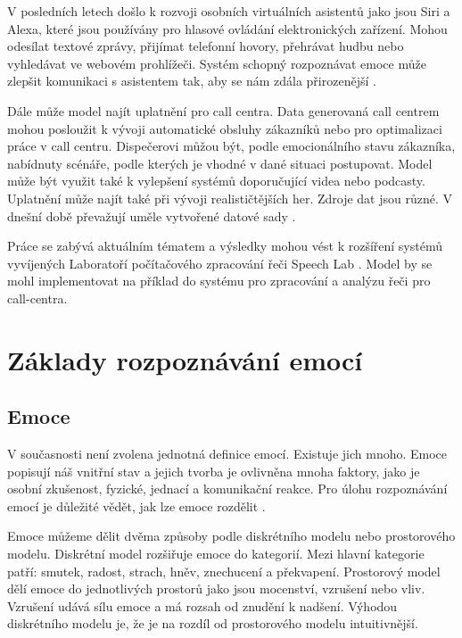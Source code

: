 \documentclass[FM,BP]{tulthesis}
\begin{document}
V posledních letech došlo k rozvoji osobních virtuálních asistentů jako jsou Siri a Alexa, které jsou používány pro hlasové ovládání elektronických zařízení. Mohou odesílat textové zprávy, přijímat telefonní hovory, přehrávat hudbu nebo vyhledávat ve webovém prohlížeči. Systém schopný rozpoznávat emoce může zlepšit komunikaci s asistentem tak, aby se nám zdála přirozenější \cite{DBLP:journals/corr/abs-1912-10458}.

Dále může model najít uplatnění pro call centra. Data generovaná call centrem mohou posloužit k vývoji automatické obsluhy zákazníků nebo pro optimalizaci práce v call centru. Dispečerovi můžou být, podle emocionálního stavu zákazníka, nabídnuty scénáře, podle kterých je vhodné v dané situaci postupovat. Model může být využit také k vylepšení systémů doporučující videa nebo podcasty. Uplatnění může najít také při vývoji realističtějších her. Zdroje dat jsou různé. V dnešní době převažují uměle vytvořené datové sady \cite{konar_chakraborty_2015}.

Práce se zabývá aktuálním tématem a výsledky mohou vést k rozšíření systémů vyvíjených Laboratoří počítačového zpracování řeči Speech Lab \cite{speechlab}. Model by se mohl implementovat na příklad do systému pro zpracování a analýzu řeči pro call-centra.

\chapter{Základy rozpoznávání emocí}

\section{Emoce} %
V současnosti není zvolena jednotná definice emocí. Existuje jich mnoho. Emoce popisují náš vnitřní stav a jejich tvorba je ovlivněna mnoha faktory, jako je osobní zkušenost, fyzické, jednací a komunikační reakce. Pro úlohu rozpoznávání emocí je důležité vědět, jak lze emoce rozdělit \cite{DBLP:journals/speech/AkcayO20}.

Emoce můžeme dělit dvěma způsoby podle diskrétního modelu nebo prostorového modelu. Diskrétní model rozšiřuje emoce do kategorií. Mezi hlavní kategorie patří: smutek, radost, strach, hněv, znechucení a překvapení. Prostorový model dělí emoce do jednotlivých prostorů jako jsou mocenství, vzrušení nebo vliv. Vzrušení udává sílu emoce a má rozsah od znudění k nadšení. Výhodou diskrétního modelu je, že je na rozdíl od prostorového modelu intuitivnější. \cite{DBLP:journals/speech/AkcayO20}
\end{document}
